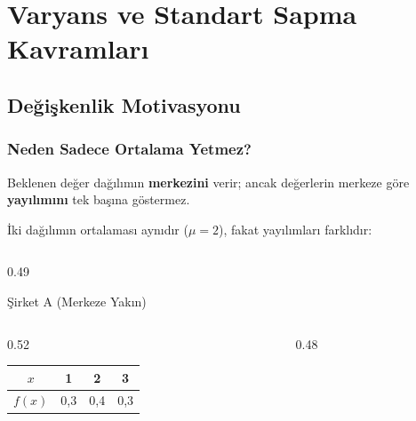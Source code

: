 ﻿\documentclass[light]{lutbeamer}
\begin{document}
\section{Varyans ve Standart Sapma Kavramları}
\subsection{Değişkenlik Motivasyonu}

\begin{frame}[fragile]
  \frametitle{Neden Sadece Ortalama Yetmez?}
  \small
  Beklenen değer dağılımın \textbf{merkezini} verir; ancak değerlerin merkeze göre \textbf{yayılımını} tek başına göstermez.

  \smallskip
  İki dağılımın ortalaması aynıdır ($\mu = 2$), fakat yayılımları farklıdır:

  \begin{columns}[T,onlytextwidth]
    \begin{column}{0.49\textwidth}
      \begin{exampleblock}{Şirket A (Merkeze Yakın)}
        \footnotesize
        \begin{columns}[T,totalwidth=\linewidth]
          \begin{column}{0.52\linewidth}
            \centering
            \setlength{\tabcolsep}{3pt}
            \renewcommand{\arraystretch}{1.05}
            \begin{tabular}{cccc}
              \toprule
              $x$ & 1 & 2 & 3 \\
              \midrule
              $f(x)$ & 0{,}3 & 0{,}4 & 0{,}3 \\
              \bottomrule
            \end{tabular}
          \end{column}
          \begin{column}{0.48\linewidth}
            \centering
\end{column}
\end{columns}
\end{exampleblock}
\end{column}
\end{columns}
\end{frame}
\end{document}
